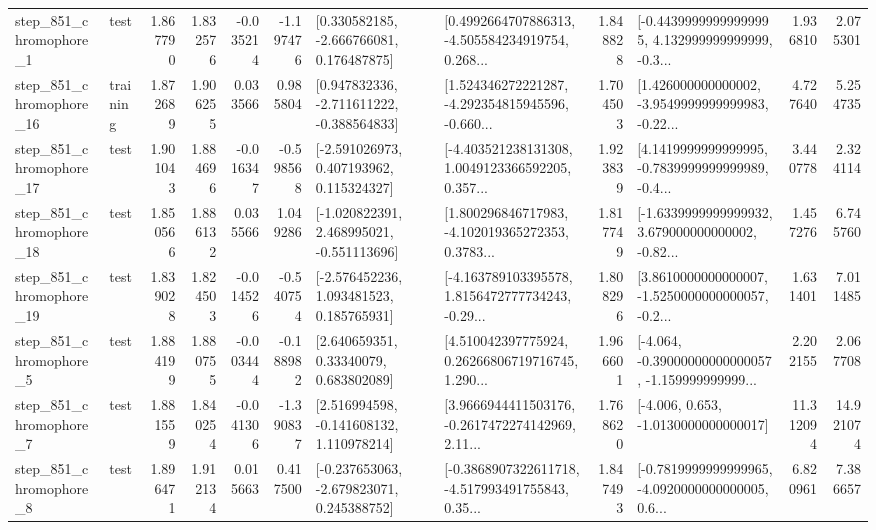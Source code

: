 \begin{tabular}{llrrrrllrlrr}
   step\_851\_chromophore\_1 &      test &      1.867790 &    1.832576 &     -0.035214 & -1.197476 &    [0.330582185, -2.666766081, 0.176487875] &  [0.4992664707886313, -4.505584234919754, 0.268... &       1.848828 &  [-0.44399999999999995, 4.132999999999999, -0.3... &            1.936810 &          2.075301 \\
  step\_851\_chromophore\_16 &  training &      1.872689 &    1.906255 &      0.033566 &  0.985804 &   [0.947832336, -2.711611222, -0.388564833] &  [1.524346272221287, -4.292354815945596, -0.660... &       1.704503 &  [1.426000000000002, -3.9549999999999983, -0.22... &            4.727640 &          5.254735 \\
  step\_851\_chromophore\_17 &      test &      1.901043 &    1.884696 &     -0.016347 & -0.598568 &    [-2.591026973, 0.407193962, 0.115324327] &  [-4.403521238131308, 1.0049123366592205, 0.357... &       1.923839 &  [4.1419999999999995, -0.7839999999999989, -0.4... &            3.440778 &          2.324114 \\
  step\_851\_chromophore\_18 &      test &      1.850566 &    1.886132 &      0.035566 &  1.049286 &   [-1.020822391, 2.468995021, -0.551113696] &  [1.800296846717983, -4.102019365272353, 0.3783... &       1.817749 &  [-1.6339999999999932, 3.679000000000002, -0.82... &            1.457276 &          6.745760 \\
  step\_851\_chromophore\_19 &      test &      1.839028 &    1.824503 &     -0.014526 & -0.540754 &    [-2.576452236, 1.093481523, 0.185765931] &  [-4.163789103395578, 1.8156472777734243, -0.29... &       1.808296 &  [3.8610000000000007, -1.5250000000000057, -0.2... &            1.631401 &          7.011485 \\
   step\_851\_chromophore\_5 &      test &      1.884199 &    1.880755 &     -0.003444 & -0.188982 &      [2.640659351, 0.33340079, 0.683802089] &  [4.510042397775924, 0.26266806719716745, 1.290... &       1.966601 &  [-4.064, -0.39000000000000057, -1.159999999999... &            2.202155 &          2.067708 \\
   step\_851\_chromophore\_7 &      test &      1.881559 &    1.840254 &     -0.041306 & -1.390837 &    [2.516994598, -0.141608132, 1.110978214] &  [3.9666944411503176, -0.2617472274142969, 2.11... &       1.768620 &               [-4.006, 0.653, -1.0130000000000017] &           11.312094 &         14.921074 \\
   step\_851\_chromophore\_8 &      test &      1.896471 &    1.912134 &      0.015663 &  0.417500 &   [-0.237653063, -2.679823071, 0.245388752] &  [-0.3868907322611718, -4.517993491755843, 0.35... &       1.847493 &  [-0.7819999999999965, -4.0920000000000005, 0.6... &            6.820961 &          7.386657 \\

\end{tabular}
